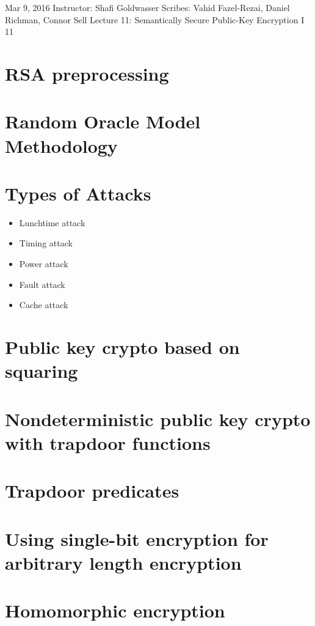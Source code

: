 \documentclass[10pt]{article}
\newcommand{\scribes}{Vahid Fazel-Rezai, Daniel Richman, Connor Sell}
\newcommand{\lecnumber}{11}
\newcommand{\lectitle}{Semantically Secure Public-Key Encryption I
}
\newcommand{\thedate}{Mar 9, 2016}
\begin{document}


{\thedate}
{Instructor: Shafi Goldwasser}
{Scribes: \scribes}
{Lecture \lecnumber: \lectitle}
{\lecnumber}


\section{RSA preprocessing}

\section{Random Oracle Model Methodology}

\section{Types of Attacks}

\begin{itemize}
	\item Lunchtime attack
	\item Timing attack
	\item Power attack
	\item Fault attack
	\item Cache attack
\end{itemize}

\section{Public key crypto based on squaring}

\section{Nondeterministic public key crypto with trapdoor functions}

\section{Trapdoor predicates}

\section{Using single-bit encryption for arbitrary length encryption}

\section{Homomorphic encryption}
\end{document}
